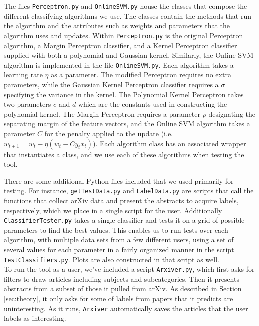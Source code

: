 \documentclass[12pt]{article}
\begin{document}
The files {\tt Perceptron.py} and {\tt OnlineSVM.py} house the classes that compose the different classifying algorithms we use.
The classes contain the methods that run the algorithm and the attributes such as weights and parameters that the algorithm uses and updates.
Within {\tt Perceptron.py} is the original Perceptron algorithm, a Margin Perceptron classifier, and a Kernel Perceptron classifier supplied with both a polynomial and Gaussian kernel.
Similarly, the Online SVM algorithm is implemented in the file {\tt OnlineSVM.py}.
Each algorithm takes a learning rate $\eta$ as a parameter. The modified Perceptron requires no extra parameters, while the Gaussian Kernel Perceptron classifier requires a $\sigma$ specifying the variance in the kernel.
The Polynomial Kernel Perceptron takes two parameters $c$ and $d$ which are the constants used in constructing the polynomial kernel.
The Margin Perceptron requires a parameter $\rho$ designating the separating margin of the feature vectors, and the Online SVM algorithm takes a parameter $C$ for the penalty applied to the update (i.e. $w_{t+1} = w_t -\eta(w_t- Cy_tx_t)$).
Each algorithm class has an associated wrapper that instantiates a class, and we use each of these algorithms when testing the tool.

There are some additional Python files included that we used primarily for testing. For instance, {\tt getTestData.py} and {\tt LabelData.py} are scripts that call the functions that collect arXiv data and present the abstracts to acquire labels, respectively, which we place in a single script for the user. Additionally {\tt ClassifierTester.py} takes a single classifier and tests it on a grid of possible parameters to find the best values. This enables us to run tests over each algorithm, with multiple data sets from a few different users, using a set of several values for each parameter in a fairly organized manner in the script {\tt TestClassifiers.py}. Plots are also constructed in that script as well.\\

To run the tool as a user, we've included a script {\tt Arxiver.py}, which first asks for filters to draw articles including subjects and subcategories. Then it presents abstracts from a subset of those it pulled from arXiv.  As described in Section \ref{sec:theory}, it only asks for some of labels from papers that it predicts are uninteresting. As it runs, {\tt Arxiver} automatically saves the articles that the user labels as interesting.\\
\end{document}
